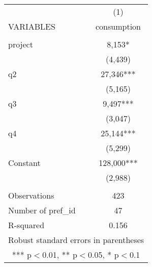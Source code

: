 \documentclass[]{article}
\begin{document}
\begin{tabular}{lc} \hline
 & (1) \\
VARIABLES & consumption \\ \hline
 &  \\
project & 8,153* \\
 & (4,439) \\
q2 & 27,346*** \\
 & (5,165) \\
q3 & 9,497*** \\
 & (3,047) \\
q4 & 25,144*** \\
 & (5,299) \\
Constant & 128,000*** \\
 & (2,988) \\
 &  \\
Observations & 423 \\
Number of pref\_id & 47 \\
 R-squared & 0.156 \\ \hline
\multicolumn{2}{c}{ Robust standard errors in parentheses} \\
\multicolumn{2}{c}{ *** p$<$0.01, ** p$<$0.05, * p$<$0.1} \\
\end{tabular}
\end{document}
